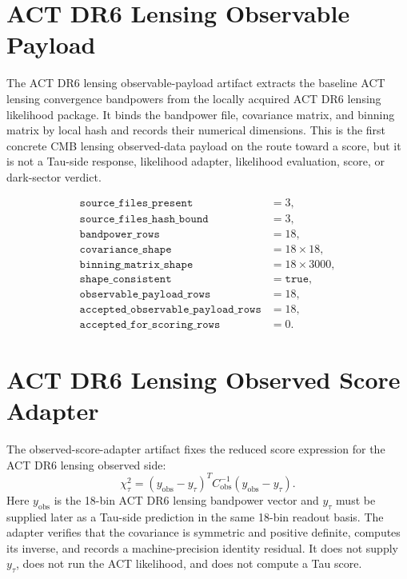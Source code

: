 \documentclass[11pt]{article}
\begin{document}
\section{ACT DR6 Lensing Observable Payload}

The ACT DR6 lensing observable-payload artifact extracts the baseline ACT
lensing convergence bandpowers from the locally acquired ACT DR6 lensing
likelihood package. It binds the bandpower file, covariance matrix, and binning
matrix by local hash and records their numerical dimensions. This is the first
concrete CMB lensing observed-data payload on the route toward a score, but it
is not a Tau-side response, likelihood adapter, likelihood evaluation, score,
or dark-sector verdict.

\[
\begin{array}{ll}
\texttt{source\_files\_present} &= 3,\\
\texttt{source\_files\_hash\_bound} &= 3,\\
\texttt{bandpower\_rows} &= 18,\\
\texttt{covariance\_shape} &= 18\times18,\\
\texttt{binning\_matrix\_shape} &= 18\times3000,\\
\texttt{shape\_consistent} &= \texttt{true},\\
\texttt{observable\_payload\_rows} &= 18,\\
\texttt{accepted\_observable\_payload\_rows} &= 18,\\
\texttt{accepted\_for\_scoring\_rows} &= 0.
\end{array}
\]

\section{ACT DR6 Lensing Observed Score Adapter}

The observed-score-adapter artifact fixes the reduced score expression for the
ACT DR6 lensing observed side:
\[
\chi^2_{\tau} =
(y_{\mathrm{obs}}-y_{\tau})^{T}
C_{\mathrm{obs}}^{-1}
(y_{\mathrm{obs}}-y_{\tau}).
\]
Here \(y_{\mathrm{obs}}\) is the 18-bin ACT DR6 lensing bandpower vector and
\(y_{\tau}\) must be supplied later as a Tau-side prediction in the same 18-bin
readout basis. The adapter verifies that the covariance is symmetric and
positive definite, computes its inverse, and records a machine-precision
identity residual. It does not supply \(y_{\tau}\), does not run the ACT
likelihood, and does not compute a Tau score.
\end{document}
